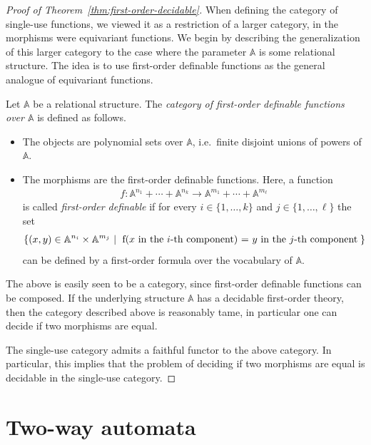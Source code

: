 \documentclass[10pt,a4paper]{amsart}
\numberwithin{equation}{section}
\theoremstyle{plain}
\newcommand{\set}[1]{\{#1\}}
\newcommand{\atoms}{\mathbb A}
\newcommand{\setbuild}[2]{\set{#1 \ | 
\begin{tabular}{l}
	#2
\end{tabular}\!\!} }
\begin{document}
\begin{proof}[Proof of Theorem~\ref{thm:first-order-decidable}]
    When defining the category of single-use functions, we viewed it as a restriction of a larger category, in the morphisms were equivariant functions.  We begin by describing the generalization of this larger category to the case where the parameter $\atoms$ is some relational structure. The idea is to use first-order definable functions as the general analogue of equivariant functions. 

\begin{definition}
    Let $\atoms$ be a relational structure. The \emph{category of first-order definable functions over $\atoms$} is defined as follows.
    \begin{itemize}
        \item The objects are polynomial sets over $\atoms$, i.e.~finite disjoint unions of powers of $\atoms$.
        \item The morphisms are the  first-order definable functions. Here, a function 
        \begin{align*}
            f : \atoms^{n_1} + \cdots + \atoms^{n_k} \to \atoms^{m_1} + \cdots + \atoms^{m_\ell}
            \end{align*}
            is called  \emph{first-order definable} if for every $i \in \set{1,\ldots,k}$ and  $j \in \set{1,\ldots,\ell}$ the set 
            \begin{align*}
            \setbuild{ (x,y) \in \atoms^{n_i} \times \atoms^{m_j}}{f(\text{$x$ in the $i$-th component}) = \text{$y$ in the $j$-th component}}
            \end{align*}
            can be defined by a first-order formula over the vocabulary of $\atoms$.
    \end{itemize}
\end{definition}
The above is easily seen to be a category, since first-order definable functions  can be composed. 
If the underlying structure $\atoms$ has a decidable first-order theory, then the category described above is reasonably tame, in particular one can decide if two morphisms are equal.

The single-use category admits a faithful functor to the above category. In particular, this implies that the problem of deciding if two morphisms are equal is decidable in the single-use category. 
\end{proof}

\section{Two-way automata}  
\end{document}
